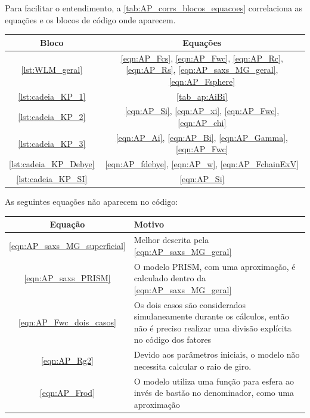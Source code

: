 \begin{apendicesenv}
Para facilitar o entendimento, a \autoref{tab:AP_corrs_blocos_equacoes} correlaciona as equações e os blocos de código onde aparecem.

\begin{table}[h]
	{%
		\begin{tabular}{c c}
			\toprule
			          Bloco           & Equações                                                                                                               \\ \midrule
			   \ref{lst:WLM_geral}    & \ref{eqn:AP_Fcs}, \ref{eqn:AP_Fwc}, \ref{eqn:AP_Rc}, \ref{eqn:AP_Rs}, \ref{eqn:AP_saxs_MG_geral}, \ref{eqn:AP_Fsphere} \\
			  \ref{lst:cadeia_KP_1}   & \autoref{tab_ap:AiBi}                                                                                                 \\
			  \ref{lst:cadeia_KP_2}   & \ref{eqn:AP_Si}, \ref{eqn:AP_xi}, \ref{eqn:AP_Fwc}, \ref{eqn:AP_chi}                                                   \\
			  \ref{lst:cadeia_KP_3}   & \ref{eqn:AP_Ai}, \ref{eqn:AP_Bi}, \ref{eqn:AP_Gamma}, \ref{eqn:AP_Fwc}                                                 \\
			\ref{lst:cadeia_KP_Debye} & \ref{eqn:AP_fdebye}, \ref{eqn:AP_w}, \ref{eqn:AP_FchainExV}                                                            \\
			 \ref{lst:cadeia_KP_SI}   & \ref{eqn:AP_Si}                                                                                                        \\ \bottomrule
		\end{tabular}%
	}{}
\end{table}

As seguintes equações não aparecem no código:

\begin{table}[h]
	{%
		\begin{tabular}{c p{10cm}}
			\toprule
			Equação   & Motivo  \\ \midrule
			\ref{eqn:AP_saxs_MG_superficial} & Melhor descrita pela \autoref{eqn:AP_saxs_MG_geral} \\
			\ref{eqn:AP_saxs_PRISM} & O modelo PRISM, com uma aproximação, é calculado dentro da \autoref{eqn:AP_saxs_MG_geral}  \\
			\ref{eqn:AP_Fwc_dois_casos} & Os dois casos são considerados simulaneamente durante os cálculos, então não é preciso realizar uma divisão explícita no código dos fatores \\
			\ref{eqn:AP_Rg2} & Devido aos parâmetros iniciais, o modelo não necessita calcular o raio de giro. \\
			\ref{eqn:AP_Frod}  & O modelo utiliza uma função para esfera ao invés de bastão no denominador, como uma aproximação \\ \bottomrule
		\end{tabular}%
	}{}
\end{table}


\end{apendicesenv}
